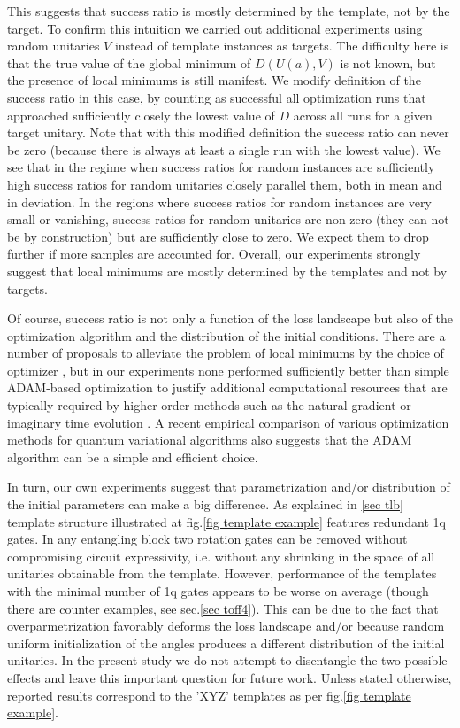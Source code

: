 \documentclass[draft, amsfonts, amssymb, aps, nofootinbib, twocolumn]{revtex4-2}
\begin{document}
This suggests that success ratio is mostly determined by the template, not by the target. To confirm this  intuition  we carried out additional experiments using random unitaries $V$ instead of template instances as targets. The difficulty here is that the true value of the global minimum of $D(U(a), V)$ is not known, but the presence of local minimums is still manifest. We modify definition of the success ratio in this case, by counting as successful all optimization runs that approached sufficiently closely the lowest value of $D$ across all runs for a given target unitary. Note that with this modified definition the success ratio can never be zero (because there is always at least a single run with the lowest value). We see that in the regime when success ratios for random instances are sufficiently high success ratios for random unitaries closely parallel them, both in mean and in deviation. In the regions where success ratios for random instances are very small or vanishing, success ratios for random unitaries are non-zero (they can not be by construction) but are sufficiently close to zero. We expect them to drop further if more samples are accounted for. Overall, our experiments strongly suggest that local minimums are mostly determined by the templates and not by targets.

Of course, success ratio is not only a function of the loss landscape but also of the optimization algorithm and the distribution of the initial conditions. There are a number of proposals to alleviate the problem of local minimums by the choice of optimizer \cite{Wierichs2020, Rivera-Dean2021}, but in our experiments none performed sufficiently better than simple ADAM\cite{adam}-based optimization to justify additional computational resources that are typically required by higher-order methods such as the natural gradient \cite{Stokes2020} or imaginary time evolution \cite{Jones2018a}. A recent empirical comparison of various optimization methods for quantum variational algorithms \cite{Lockwood2022} also suggests that the ADAM algorithm can be a simple and efficient choice.

In turn, our own experiments suggest that parametrization and/or distribution of the initial parameters can make a big difference. As explained in \ref{sec tlb} template structure illustrated at fig.\ref{fig template example} features redundant 1q gates. In any entangling block two rotation gates can be removed without compromising circuit expressivity, i.e. without any shrinking in the space of all unitaries obtainable from the template. However, performance of the templates with the minimal number of 1q gates appears to be worse on average (though there are counter examples, see sec.\ref{sec toff4}). This can be due to the fact that overparmetrization favorably deforms the loss landscape and/or because random uniform initialization of the angles produces a different distribution of the initial unitaries. In the present study we do not attempt to disentangle the two possible effects and leave this important question for future work. Unless stated otherwise, reported results correspond to the 'XYZ' templates as per fig.\ref{fig template example}.
\end{document}
